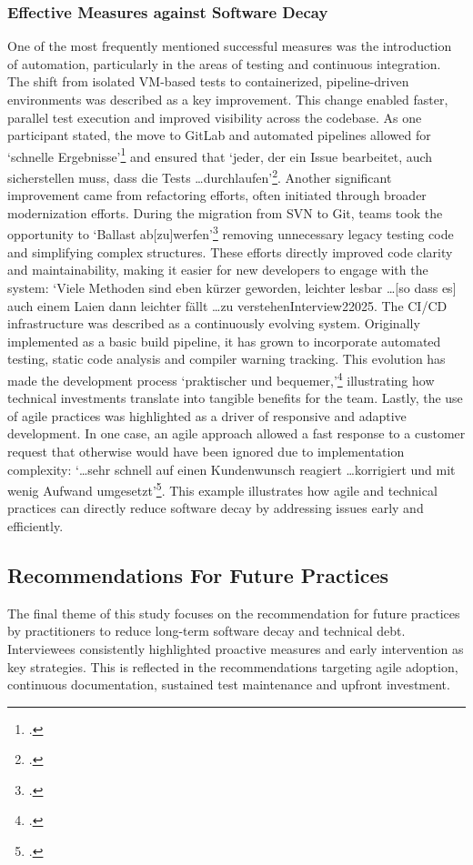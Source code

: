 \subsubsection{Effective Measures against Software Decay}
One of the most frequently mentioned successful measures was the introduction of automation, particularly in the areas of testing and continuous integration. The shift from isolated VM-based tests to containerized, pipeline-driven environments was described as a key improvement. This change enabled faster, parallel test execution
and improved visibility across the codebase. As one participant stated, the move to GitLab and automated pipelines allowed for `schnelle Ergebnisse'\footcite{Interview32025} and ensured that `jeder, der ein Issue bearbeitet, auch sicherstellen muss, dass die Tests \ldots durchlaufen'\footcite{Interview32025}.
Another significant improvement came from refactoring efforts, often initiated through broader modernization efforts. During the migration from SVN to Git, teams took the opportunity to `Ballast ab[zu]werfen'\footcite{Interview32025} removing unnecessary legacy testing code and simplifying complex structures. These efforts directly improved code clarity and maintainability,
making it easier for new developers to engage with the system: `Viele Methoden sind eben kürzer geworden, leichter lesbar \ldots [so dass es] auch einem Laien dann leichter fällt \ldots zu verstehen{Interview22025}.
The CI/CD infrastructure was described as a continuously evolving system. Originally implemented as a basic build pipeline, it has grown to incorporate automated testing, static code analysis and compiler warning tracking. This evolution has made the development process `praktischer und bequemer,'\footcite{Interview22025} illustrating how technical
investments translate into tangible benefits for the team.
Lastly, the use of agile practices was highlighted as a driver of responsive and adaptive development. In one case, an agile approach allowed a fast response to a customer request that otherwise would have been ignored due to implementation complexity: `\ldots sehr schnell auf einen Kundenwunsch reagiert \ldots korrigiert und mit wenig Aufwand umgesetzt'\footcite{Interview32025}.
This example illustrates how agile and technical practices can directly reduce software decay by addressing issues early and efficiently.

\subsection{Recommendations For Future Practices}
The final theme of this study focuses on the recommendation for future practices by practitioners to reduce long-term software decay and technical debt. Interviewees consistently highlighted proactive measures and early intervention as key strategies. This is reflected in the recommendations targeting agile adoption, continuous documentation, sustained test maintenance and upfront investment.

